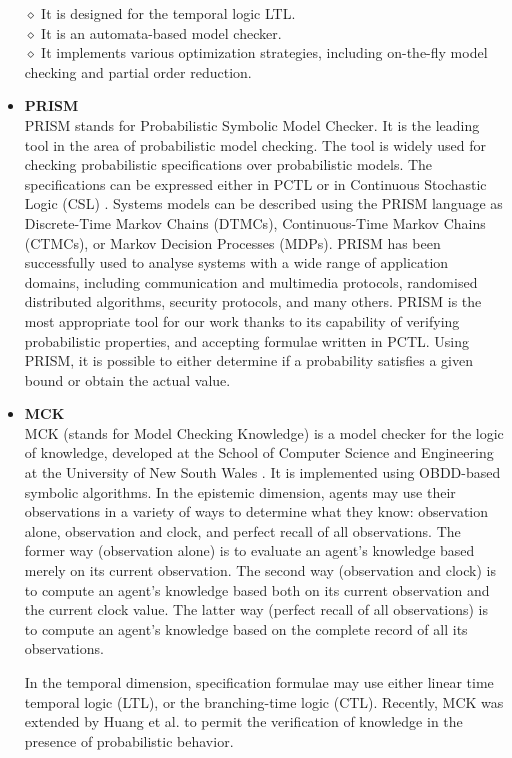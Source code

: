 \begin{itemize}
    $\diamond$ It is designed for the temporal logic LTL.\\
    $\diamond$ It is an automata-based model checker.\\
    $\diamond$ It implements various optimization strategies, including on-the-fly model checking and partial order reduction.

\item \textbf{PRISM} \\
    PRISM \cite{Kwiatkowska2002} stands for Probabilistic Symbolic Model Checker. It is the leading tool in the area of probabilistic model checking. The tool is widely used for checking probabilistic specifications over probabilistic models. The specifications can be expressed either in PCTL or in Continuous Stochastic Logic (CSL) \cite{Baier2008,Forejt2011}. Systems models can be described using the PRISM language as Discrete-Time Markov Chains (DTMCs), Continuous-Time Markov Chains (CTMCs), or Markov Decision Processes (MDPs). PRISM has been successfully used to analyse systems with a wide range of application domains, including communication and multimedia protocols, randomised distributed algorithms, security protocols, and many others.
    PRISM is the most appropriate tool for our work thanks to its capability of verifying probabilistic properties, and accepting formulae written in PCTL. Using PRISM, it is possible to either determine if a probability satisfies a given bound or obtain the actual value.

\item \textbf{MCK} \\
    MCK (stands for Model Checking Knowledge) is a model checker for the logic of knowledge, developed at the School of Computer Science and Engineering at the University of New South Wales \cite{Gammie2004}. It is implemented using OBDD-based symbolic algorithms. In the epistemic dimension, agents may use their observations in a variety of ways to determine what they know: observation alone, observation and clock, and perfect recall of all observations. The former way (observation alone) is to evaluate an agent's knowledge based merely on its current observation. The second way (observation and clock) is to compute an agent's knowledge based both on its current observation and the current clock value. The latter way (perfect recall of all observations) is to compute an agent's knowledge based on the complete record of all its observations.

    In the temporal dimension, specification formulae may use either linear time temporal logic (LTL), or the branching-time logic (CTL).
    Recently, MCK was extended by Huang et al. \cite{Huang2011} to permit the verification of knowledge in the presence of probabilistic behavior.





\end{itemize}

